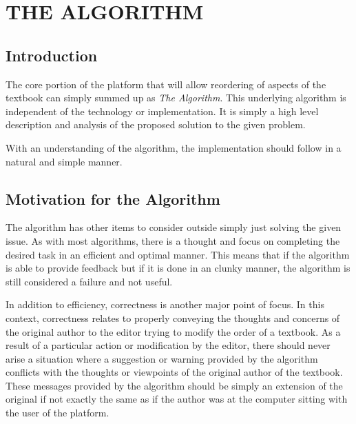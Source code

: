 %
%
%
%

\chapter{THE ALGORITHM}


\section{Introduction}

The core portion of the platform that will allow reordering of aspects of the textbook can simply summed up as \textit{The Algorithm}. This underlying algorithm is independent of the technology or implementation. It is simply a high level description and analysis of the proposed solution to the given problem.

With an understanding of the algorithm, the implementation should follow in a natural and simple manner.

\section{Motivation for the Algorithm}

The algorithm has other items to consider outside simply just solving the given issue. As with most algorithms, there is a thought and focus on completing the desired task in an efficient and optimal manner. This means that if the algorithm is able to provide feedback but if it is done in an clunky manner, the algorithm is still considered a failure and not useful.

In addition to efficiency, correctness is another major point of focus. In this context, correctness relates to properly conveying the thoughts and concerns of the original author to the editor trying to modify the order of a textbook. As a result of a particular action or modification by the editor, there should never arise a situation where a suggestion or warning provided by the algorithm conflicts with the thoughts or viewpoints of the original author of the textbook. These messages provided by the algorithm should be simply an extension of the original if not exactly the same as if the author was at the computer sitting with the user of the platform.

